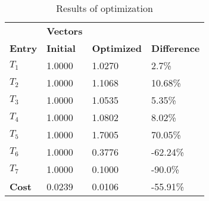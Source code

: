 \begin{table}[H]
\centering
\begin{tabular}{llll}
\textbf{}      & \cellcolor[HTML]{EFEFEF}\textbf{Vectors} & \textbf{} & \textbf{}         \\
\rowcolor[HTML]{EFEFEF} 
\textbf{Entry} & \textbf{Initial} & \textbf{Optimized} & \textbf{Difference} \\
$T_1$ & 1.0000 & 1.0270 & 2.7\% \\ 
$T_2$ & 1.0000 & 1.1068 & 10.68\% \\ 
$T_3$ & 1.0000 & 1.0535 & 5.35\% \\ 
$T_4$ & 1.0000 & 1.0802 & 8.02\% \\ 
$T_5$ & 1.0000 & 1.7005 & 70.05\% \\ 
$T_6$ & 1.0000 & 0.3776 & -62.24\% \\ 
$T_7$ & 1.0000 & 0.1000 & -90.0\% \\ 
\rowcolor[HTML]{EFEFEF} 
\textbf{Cost}  & 0.0239 & 0.0106 & -55.91\% \\ 
\end{tabular}
\caption{Results of optimization}
\label{tab:OptimizationAnalysis}
\end{table}